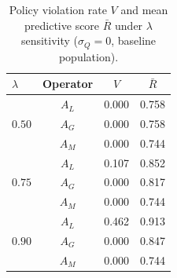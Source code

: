 \begin{table}[H]
\caption{Policy violation rate $V$ and mean predictive score $\bar{R}$ under $\lambda$ sensitivity ($\sigma_Q=0$, baseline population).}
\label{tab:lambda-robustness}
\centering
\small
\renewcommand{\arraystretch}{1.2}
\begin{tabular}{lccc}
\toprule
$\lambda$ & Operator & $V$ & $\bar{R}$ \\
\midrule
\multirow{3}{*}{$0.50$} & $A_L$ & 0.000 & 0.758 \\
 & $A_G$ & 0.000 & 0.758 \\
 & $A_M$ & 0.000 & 0.744 \\
\midrule
\multirow{3}{*}{$0.75$} & $A_L$ & 0.107 & 0.852 \\
 & $A_G$ & 0.000 & 0.817 \\
 & $A_M$ & 0.000 & 0.744 \\
\midrule
\multirow{3}{*}{$0.90$} & $A_L$ & 0.462 & 0.913 \\
 & $A_G$ & 0.000 & 0.847 \\
 & $A_M$ & 0.000 & 0.744 \\
\bottomrule
\end{tabular}
\end{table}
